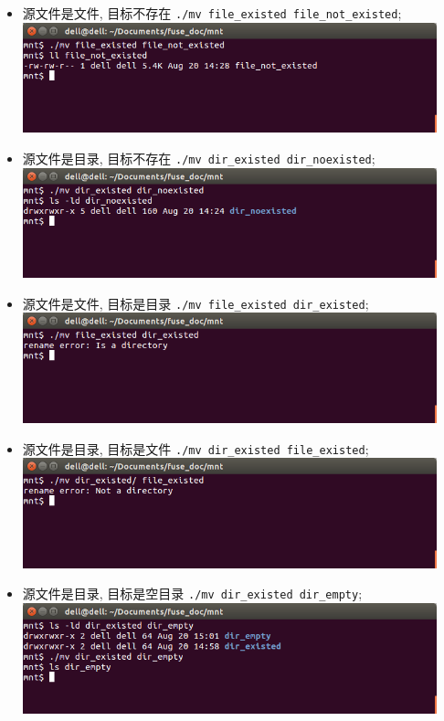 \documentclass[nofonts]{ctexart}
\begin{document}
\begin{itemize}
\begin{itemize}
\item
  源文件是文件, 目标不存在
  \texttt{./mv file\_existed file\_not\_existed};\\
  \includegraphics[width=12cm]{./images/./mv_t2.png}
\item
  源文件是目录, 目标不存在 \texttt{./mv dir\_existed dir\_noexisted};\\
  \includegraphics[width=12cm]{./images/./mv_t3.png}
\item
  源文件是文件, 目标是目录 \texttt{./mv file\_existed dir\_existed};\\
  \includegraphics[width=12cm]{./images/./mv_t4.png}
\item
  源文件是目录, 目标是文件 \texttt{./mv dir\_existed file\_existed};\\
  \includegraphics[width=12cm]{./images/./mv_t5.png}
\item
  源文件是目录, 目标是空目录 \texttt{./mv dir\_existed dir\_empty};\\
  \includegraphics[width=12cm]{./images/./mv_t6.png}

\end{itemize}
\end{itemize}
\end{document}
